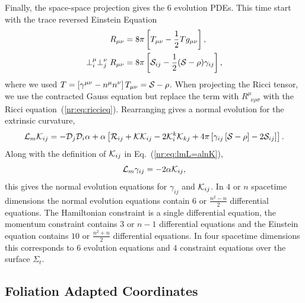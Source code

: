 Finally, the space-space projection gives the 6 evolution PDEs. This time start with the trace reversed Einstein Equation
\begin{align} R_{\mu\nu} &= 8 \pi \left[T_{\mu\nu} - \frac{1}{2}Tg_{\mu\nu}\right],\\
\perp^\mu_i\perp^\nu_jR_{\mu\nu} &= 8 \pi \left[\S_{ij} - \frac{1}{2}(\S-\rho)\gamma_{ij}\right],
\end{align}
where we used $T = \left[ \gamma^{\mu\nu} - n^\mu n^\nu\right]T_{\mu\nu} = \S-\rho$. When projecting the Ricci tensor, we use the contracted Gauss equation but replace the term with $R^\mu_{\,\,\,\nu\rho\sigma}$ with the Ricci equation~(\ref{nr:eq:riccieq}). Rearranging gives a normal evolution for the extrinsic curvature,
\begin{equation} \L_m \K_{ij} = -\D_j\D_i \alpha + \alpha \left[ \R_{ij} + \K\K_{ij} - 2\K^k_i\K_{kj} + 4\pi \left[ \gamma_{ij}\left[ \S-\rho\right]-2\S_{ij}\right]\right].\end{equation}
Along with the definition of $\K_{ij}$ in Eq.~(\ref{nr:eq:lmL=alnK}),
\begin{equation} \label{nr:eq:Lmgamma}
\L_m \gamma_{ij} = -2\alpha \K_{ij},
\end{equation}
this gives the normal evolution equations for $\gamma_{ij}$ and $\K_{ij}$. In $4$ or $n$ spacetime dimensions the normal evolution equations contain $6$ or $\frac{n^2-n}{2}$ differential equations. The Hamiltonian constraint is a single differential equation, the momentum constraint contains $3$ or $n-1$ differential equations and the Einstein equation contains $10$ or $\frac{n^2+n}{2}$ differential equations. In four spacetime dimensions this corresponds to $6$ evolution equations and $4$ constraint equations over the surface $\Sigma_t$.

\subsection{Foliation Adapted Coordinates}

